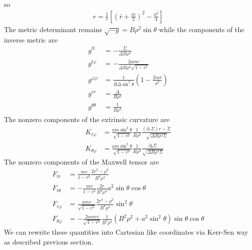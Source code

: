 \documentclass[%
 reprint,
 amsmath,amssymb,
 aps,
]{revtex4-1}
\begin{document}
so
\begin{align}
r = \frac{1}{\bar{r}} \left[ \left(\bar{r} + \frac{m}{2} \right)^2 - \frac{a^2}{4} \right]
\end{align}
The metric determinant remains $\sqrt{-g} = B \rho^2 \sin \theta$ while the components of the inverse metric are
\begin{align}
g^{tt} &= - \frac{\Sigma}{\Delta B \rho^2} \\
g^{t \varphi} &= - \frac{2 a m r}{\Delta B \rho^2 \sqrt{1-v^2}} \\
g^{\varphi \varphi} &= \frac{1}{B \Delta \sin^2 \theta} \left(1-\frac{2mr}{\rho^2} \right) \\
g^{rr} &= \frac{\Delta}{B \rho^2} \\
g^{\theta \theta} &= \frac{1}{B \rho^2}
\end{align}
The nonzero components of the extrinsic curvature are
\begin{align}
K_{r \varphi} &= \frac{a m \sin^2 \theta}{\sqrt{1-v^2}} \frac{1}{B \rho^2} \frac{(\partial_r \Sigma) r - \Sigma}{\sqrt{\Delta B \rho^2 \Sigma}} \\
K_{\theta \varphi} &= \frac{a m \sin^2 \theta}{\sqrt{1-v^2}} \frac{1}{B \rho^2} \frac{\partial_\theta \Sigma }{\sqrt{\Delta B \rho^2 \Sigma}} 
\end{align}
The nonzero components of the Maxwell tensor are
\begin{align}
F_{tr} &= \frac{mv}{1-v^2} \frac{2r^2 - \rho^2}{B^4 \rho^4} \\
F_{t \theta} &= - \frac{mv}{1-v^2} \frac{2r}{B^4 \rho^4} a^2 \sin \theta \cos \theta \\
F_{r \varphi} &= \frac{amv}{\sqrt{1-v^2}} \frac{2r^4 - \rho^2}{B^4 \rho^4} \sin^2 \theta \\
F_{\theta \varphi} &= -\frac{2amrv}{\sqrt{1-v^2}} \frac{1}{B^4 \rho^4} (B^2 \rho^2 + a^2 \sin^2 \theta) \sin \theta \cos \theta
\end{align}
We can rewrite these quantities into Cartesian like coordinates via Kerr-Sen way as described previous section.
\end{document}
